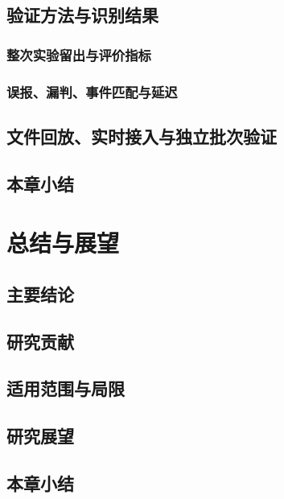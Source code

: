 \section{验证方法与识别结果}
\subsection{整次实验留出与评价指标}
\subsection{误报、漏判、事件匹配与延迟}
\section{文件回放、实时接入与独立批次验证}
\section{本章小结}

\chapter{总结与展望}
\section{主要结论}
\section{研究贡献}
\section{适用范围与局限}
\section{研究展望}
\section{本章小结}

